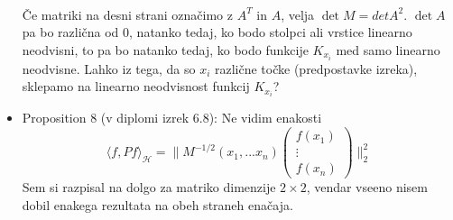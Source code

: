 \documentclass[12pt,a4paper]{amsart}
\theoremstyle{definition} %
\theoremstyle{plain} %
\begin{document}
\begin{itemize}
\begin{gather*}
\end{gather*}
Če matriki na desni strani označimo z $A^T$ in $A$, velja $\det{M} = det {A^2}$. $\det{A}$ pa bo različna od 0, natanko tedaj, ko bodo stolpci ali vrstice linearno neodvisni, to pa bo natanko tedaj, ko bodo funkcije $K_{x_i}$ med samo linearno neodvisne. Lahko iz tega, da so $x_i$ različne točke (predpostavke izreka), sklepamo na linearno neodvisnost funkcij $K_{x_i}$? 
\newline
\item Proposition 8 (v diplomi izrek 6.8): Ne vidim enakosti 
$$\langle f, Pf\rangle_{\mathcal{H}} = \|M^{-1/2}(x_1,...x_n)
\begin{pmatrix}
  f(x_1)  \\
  \vdots     \\
  f(x_n)
 \end{pmatrix}
\|_2^2  
$$
Sem si razpisal na dolgo za matriko dimenzije $2 \times 2$,  vendar vseeno nisem dobil enakega rezultata na obeh straneh enačaja.
\end{itemize}
\end{document}
